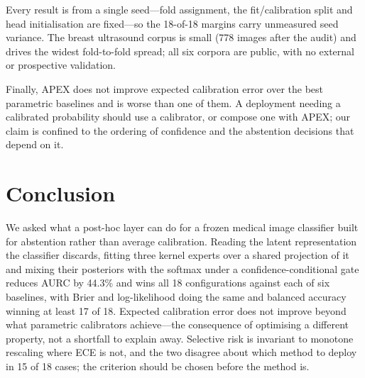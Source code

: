 \documentclass[conference]{IEEEtran}
\begin{document}
Every result is from a single seed---fold assignment, the fit/calibration split
and head initialisation are fixed---so the 18-of-18 margins carry unmeasured seed
variance. The breast ultrasound corpus is small (778 images after the audit) and
drives the widest fold-to-fold spread; all six corpora are public, with no
external or prospective validation.

Finally, APEX does not improve expected calibration error over the best parametric
baselines and is worse than one of them. A deployment needing a calibrated
probability should use a calibrator, or compose one with APEX; our claim is
confined to the ordering of confidence and the abstention decisions that depend on
it.

\section{Conclusion}

We asked what a post-hoc layer can do for a frozen medical image classifier built
for abstention rather than average calibration. Reading the latent representation
the classifier discards, fitting three kernel experts over a shared projection of
it and mixing their posteriors with the softmax under a confidence-conditional
gate reduces AURC by 44.3\% and wins all 18 configurations against each of six
baselines, with Brier and log-likelihood doing the same and balanced accuracy
winning at least 17 of 18. Expected calibration error does not improve beyond what
parametric calibrators achieve---the consequence of optimising a different
property, not a shortfall to explain away. Selective risk is invariant to monotone
rescaling where ECE is not, and the two disagree about which method to deploy in
15 of 18 cases; the criterion should be chosen before the method is.



\end{document}
